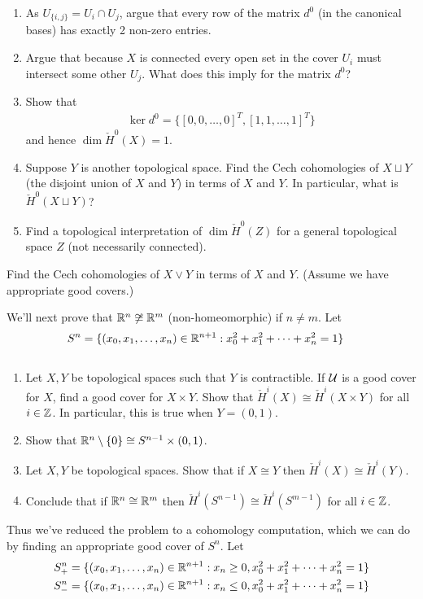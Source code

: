 \begin{ques} $ $
  \begin{enumerate}
    \item As $U_{\{i,j\}} = U_i \cap U_j$, argue that every row of the matrix $d^0$ (in the canonical bases) has exactly 2 non-zero entries.
    \item Argue that because $X$ is connected every open set in the cover $U_i$ must intersect some other $U_j$. What does this imply for the matrix $d^0$?
    \item Show that
    \begin{align*}
        \ker d^0 = \{ [0, 0, \dots, 0]^T, [1, 1, \dots, 1]^T\}
    \end{align*}
    and hence $\dim \check H^0(X) = 1$.
    \item Suppose $Y$ is another topological space.
      Find the Cech cohomologies of $X \sqcup Y$ (the disjoint union of $X$ and $Y$) in terms of  $X$ and $Y$. In particular, what is $\check H^0(X \sqcup Y)$?
    \item Find a topological interpretation of $\dim \check H^0(Z)$ for a general topological space $Z$ (not necessarily connected).
  \end{enumerate}
\end{ques}

\begin{ques} Find the Cech cohomologies of $X \vee Y$ in terms of  $X$ and $Y$. (Assume we have appropriate good covers.)
\end{ques}

\newpage
We'll next prove that $\mathbb{R}^n \not \cong \mathbb{R}^m$ (non-homeomorphic) if $n \not = m$. Let
\begin{align*}
  S^n &= \{ (x_0, x_1, \dots, x_n) \in \mathbb{R}^{n+1}: x_0^2 + x_1^2 + \dots + x_n^2 = 1 \}
\end{align*}
\begin{ques} $ $
  \begin{enumerate}
  \item Let $X, Y$ be topological spaces such that $Y$ is contractible. If $\mathcal{U}$ is a good cover for $X$, find a good cover for $X \times Y$. Show that $\check H^i(X) \cong \check H^i(X \times Y)$ for all $i \in \mathbb{Z}$. In particular, this is true when $Y = (0,1)$.
  \item Show that $\mathbb{R}^{n} \setminus \{ 0 \} \cong S^{n-1} \times (0,1)$.
  \item Let $X, Y$ be topological spaces. Show that if $X \cong Y$ then $\check H^i(X) \cong \check H^i(Y)$.
  \item Conclude that if $\mathbb{R}^n \cong \mathbb{R}^m$ then  $\check H^i (S^{n-1}) \cong \check H^i (S^{m-1})$ for all $i \in \mathbb{Z}$.
\end{enumerate}
\end{ques}
\noindent Thus we've reduced the problem to a cohomology computation, which we can do by finding an appropriate good cover of $S^{n}$. Let \begin{align*}
  S^n_+ &= \{ (x_0, x_1, \dots, x_n) \in \mathbb{R}^{n+1}: x_n \ge 0, x_0^2 + x_1^2 + \dots + x_n^2 = 1 \}\\
  S^n_- &= \{ (x_0, x_1, \dots, x_n) \in \mathbb{R}^{n+1}:  x_n \le 0, x_0^2 + x_1^2 + \dots + x_n^2 = 1 \}
\end{align*}


